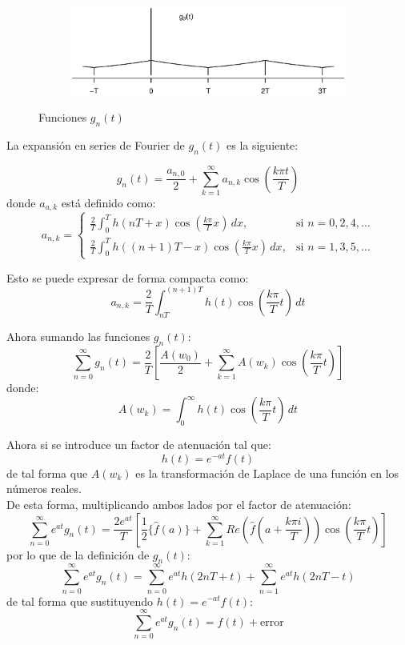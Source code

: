 \documentclass[11pt]{article}
\numberwithin{equation}{section} %
\begin{document}
\begin{figure}[htbp]
\begin{subfigure}[b]{\textwidth}
\centering
\includegraphics[width=\textwidth,trim=0 1.5cm 0 2.5cm]{g3t.eps}
\end{subfigure}

\caption{Funciones $g_n(t)$}
\label{fourier}
\end{figure}


La expansión en series de Fourier de $g_n(t)$ es la siguiente:

\[
g_n(t)=\frac{a_{n,0}}{2}+\sum_{k=1}^{\infty}a_{n,k}\cos\left(\frac{k\pi t}{T}\right)
\]
donde $a_{a,k}$ está definido como:
\[
a_{n,k} =
\begin{cases}
\displaystyle \frac{2}{T}\int_0^T h(nT+x)\cos\left(\frac{k\pi}{T}x\right)\,dx, & \mbox{si } n=0,2,4,\ldots \\
\displaystyle \frac{2}{T}\int_0^T h((n+1)T-x)\cos\left(\frac{k\pi}{T}x\right)\,dx, & \mbox{si } n=1,3,5,\ldots
\end{cases}
\]

Esto se puede expresar de forma compacta como:
\[
a_{n,k}=\frac{2}{T}\int_{nT}^{(n+1)T} h(t)\cos\left(\frac{k\pi}{T}t\right)\,dt
\]

Ahora sumando las funciones $g_n(t)$:
\[
\sum_{n=0}^{\infty}g_n(t)=\frac{2}{T}\left[\frac{A(w_0)}{2}+\sum_{k=1}^{\infty}A(w_k)\cos\left(\frac{k\pi}{T}t\right)\right]
\]
donde:
\[
A(w_k)=\int_0^\infty h(t)\cos\left(\frac{k\pi}{T}t\right)\,dt
\]

Ahora si se introduce un factor de atenuación tal que:
\[
h(t)=e^{-at}f(t)
\]
de tal forma que $A(w_k)$ es la transformación de Laplace de una función en los números reales.\\

De esta forma, multiplicando ambos lados por el factor de atenuación:
\[
\sum_{n=0}^{\infty}e^{at}g_n(t)=\frac{2e^{at}}{T}\left[\frac{1}{2} \{\hat{f}(a) \}+\sum_{k=1}^{\infty}Re\left(\hat{f}\left(a+\frac{k\pi i}{T}\right)\right)\cos\left(\frac{k\pi}{T}t\right)\right]
\]
por lo que de la definición de $g_n(t)$:
\[
\sum_{n=0}^{\infty}e^{at}g_n(t)=\sum_{n=0}^{\infty}e^{at}h(2nT+t)+\sum_{n=1}^{\infty}e^{at}h(2nT-t)
\]
de tal forma que sustituyendo $h(t)=e^{-at}f(t)$:
\[
\sum_{n=0}^{\infty}e^{at}g_n(t) = f(t) + \text{error}
\]
\end{document}

